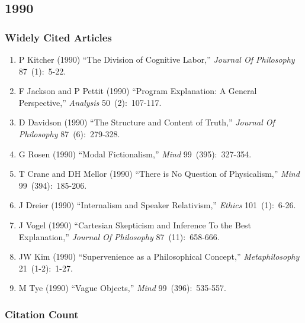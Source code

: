 \documentclass[
  10pt,
  letterpaper,
  DIV=11,
  numbers=noendperiod,
  twoside]{scrartcl}
\providecommand{\tightlist}{%
  \setlength{\itemsep}{0pt}\setlength{\parskip}{0pt}}\usepackage{longtable,booktabs,array}
\begin{document}
\newpage

\subsection{1990}\label{sec-s1990}

\subsubsection*{Widely Cited Articles}\label{widely-cited-articles-34}

\begin{enumerate}
\def\labelenumi{\arabic{enumi}.}
\tightlist
\item
  P Kitcher (1990) ``The Division of Cognitive Labor,'' \emph{Journal Of
  Philosophy} 87~(1):~5-22.
\item
  F Jackson and P Pettit (1990) ``Program Explanation: A General
  Perspective,'' \emph{Analysis} 50~(2):~107-117.
\item
  D Davidson (1990) ``The Structure and Content of Truth,''
  \emph{Journal Of Philosophy} 87~(6):~279-328.
\item
  G Rosen (1990) ``Modal Fictionalism,'' \emph{Mind} 99~(395):~327-354.
\item
  T Crane and DH Mellor (1990) ``There is No Question of Physicalism,''
  \emph{Mind} 99~(394):~185-206.
\item
  J Dreier (1990) ``Internalism and Speaker Relativism,'' \emph{Ethics}
  101~(1):~6-26.
\item
  J Vogel (1990) ``Cartesian Skepticism and Inference To the Best
  Explanation,'' \emph{Journal Of Philosophy} 87~(11):~658-666.
\item
  JW Kim (1990) ``Supervenience as a Philosophical Concept,''
  \emph{Metaphilosophy} 21~(1-2):~1-27.
\item
  M Tye (1990) ``Vague Objects,'' \emph{Mind} 99~(396):~535-557.
\end{enumerate}

\subsubsection*{Citation Count}\label{sec-count-1990}
\end{document}
